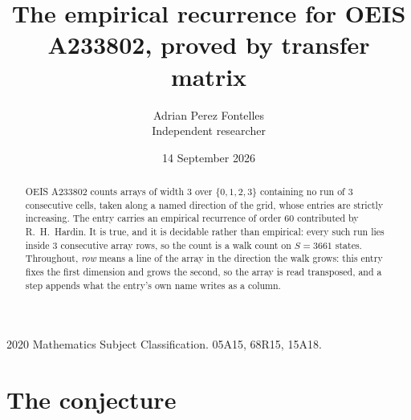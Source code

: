 \documentclass[11pt,a4paper]{article}
\title{The empirical recurrence for OEIS A233802, proved by transfer matrix}
\author{Adrian Perez Fontelles\\ \small Independent researcher}
\date{14 September 2026}
\theoremstyle{plain}
\theoremstyle{definition}
\begin{document}
\maketitle

\begin{abstract}
OEIS A233802 counts arrays of width $3$ over $\{0,1,2,3\}$ containing no run of $3$ consecutive
cells, taken along a named direction of the grid, whose entries are strictly increasing. The entry carries
an empirical recurrence of order $60$ contributed by R.~H.~Hardin. It is true, and it is
decidable rather than empirical: every such run lies inside $3$ consecutive array rows, so
the count is a walk count on $S=3661$ states.
 Throughout, \emph{row} means a line of the array in the direction the walk grows: this entry fixes the first dimension and grows the second, so the array is read transposed, and a step appends what the entry's own name writes as a column.\end{abstract}

\noindent\small 2020 Mathematics Subject Classification. 05A15, 68R15, 15A18.\normalsize

\section{The conjecture}
\end{document}
